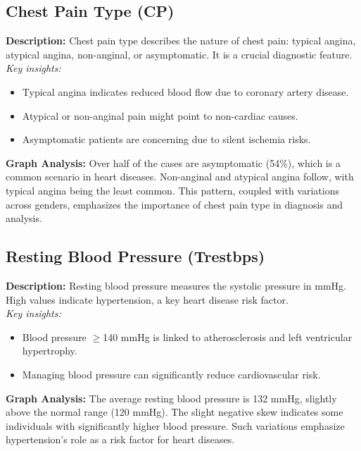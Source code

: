 \documentclass[pdflatex,sn-nature,Numbered]{sn-jnl}%
\theoremstyle{thmstyleone}%
\theoremstyle{thmstyletwo}%
\theoremstyle{thmstylethree}%
\begin{document}
\subsection{Chest Pain Type (CP)}
\textbf{Description:} 
Chest pain type describes the nature of chest pain: typical angina, atypical angina, non-anginal, or asymptomatic. It is a crucial diagnostic feature. \\
\textit{Key insights:}
\begin{itemize}
    \item Typical angina indicates reduced blood flow due to coronary artery disease.
    \item Atypical or non-anginal pain might point to non-cardiac causes.
    \item Asymptomatic patients are concerning due to silent ischemia risks.
\end{itemize}
\textbf{Graph Analysis:} 
Over half of the cases are asymptomatic (54\%), which is a common scenario in heart diseases. Non-anginal and atypical angina follow, with typical angina being the least common. This pattern, coupled with variations across genders, emphasizes the importance of chest pain type in diagnosis and analysis.

\subsection{Resting Blood Pressure (Trestbps)}
\textbf{Description:} 
Resting blood pressure measures the systolic pressure in mmHg. High values indicate hypertension, a key heart disease risk factor. \\
\textit{Key insights:}
\begin{itemize}
    \item Blood pressure $\geq$140 mmHg is linked to atherosclerosis and left ventricular hypertrophy.
    \item Managing blood pressure can significantly reduce cardiovascular risk.
\end{itemize}
\textbf{Graph Analysis:} 
The average resting blood pressure is 132 mmHg, slightly above the normal range (120 mmHg). The slight negative skew indicates some individuals with significantly higher blood pressure. Such variations emphasize hypertension's role as a risk factor for heart diseases.
\end{document}
